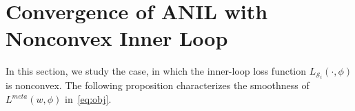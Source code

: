 \documentclass{osudissert96}
\newtheorem{lemma}{Lemma}
\begin{document}
\section{Convergence of ANIL with Nonconvex Inner Loop}\label{sec:nonconvex}
In this section, we study the case, in which the inner-loop loss function $L_{\mathcal{S}_i}(\cdot,\phi)$ is  nonconvex. 
The following proposition characterizes the smoothness of $L^{meta}(w,\phi)$ in~\cref{eq:obj}.
\end{document}
